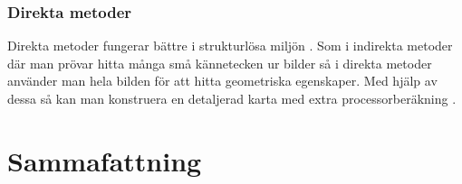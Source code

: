 \subsection{Direkta metoder}

Direkta metoder fungerar bättre i strukturlösa miljön \citep{Engel2014LSDSLAMLD}. Som i indirekta metoder där man prövar hitta många små kännetecken ur bilder så i direkta metoder använder man hela bilden för att hitta geometriska egenskaper. Med hjälp av dessa så kan man konstruera en detaljerad karta med extra processorberäkning \citep{geospatial}. 

\chapter{Sammafattning}

